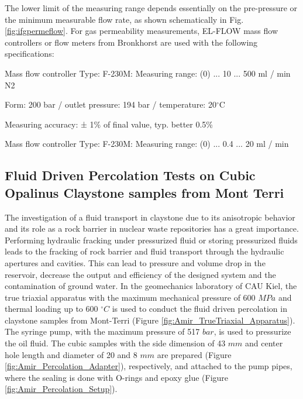 The lower limit of the measuring range depends essentially on the pre-pressure or the minimum measurable flow rate, as shown schematically in Fig. \ref{fig:ifgpermeflow}.
%
For gas permeability measurements, EL-FLOW mass flow controllers or flow meters from Bronkhorst are used with the following specifications:

\begin{list}{-}{\leftmargin=1em \itemindent=0em \itemsep=0em}
\item Mass flow controller Type: F-230M: Measuring range: (0) ... 10 ... 500 ml / min N2
\item Form: 200 bar / outlet pressure: 194 bar / temperature: 20$^\circ$C
\item Measuring accuracy: ± 1\% of final value, typ. better 0.5\%
\item Mass flow controller Type: F-230M: Measuring range: (0) ... 0.4 ... 20 ml / min
\end{list}

\subsection{Fluid Driven Percolation Tests on Cubic Opalinus Claystone samples from Mont Terri}
\label{sec:Percolation_Claystone_Exp}

The investigation of a fluid transport in claystone due to its anisotropic behavior and its role as a rock barrier in nuclear waste repositories has a great importance. Performing hydraulic fracking under pressurized fluid or storing pressurized fluids leads to the fracking of rock barrier and fluid transport through the hydraulic apertures and cavities. This can lead to pressure and volume drop in the reservoir, decrease the output and efficiency of the designed system and the contamination of ground water. In the geomechanics laboratory of CAU Kiel, the true triaxial apparatus with the maximum mechanical pressure of 600 $MPa$ and thermal loading up to 600 $^{\circ}C$ is used to conduct the fluid driven percolation in claystone samples from Mont-Terri (Figure \ref{fig:Amir_TrueTriaxial_Apparatus}). The syringe pump, with the maximum pressure of 517 $bar$, is used to pressurize the oil fluid. The cubic samples with the side dimension of 43 $mm$ and center hole length and diameter of 20 and 8 $mm$ are prepared (Figure \ref{fig:Amir_Percolation_Adapter}), respectively, and attached to the pump pipes, where the sealing is done with O-rings and epoxy glue (Figure \ref{fig:Amir_Percolation_Setup}). 

